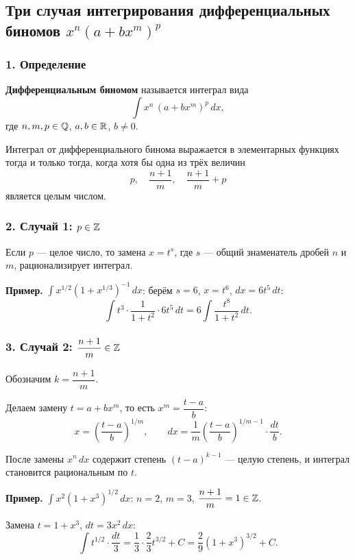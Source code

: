 \subsection{Три случая интегрирования дифференциальных биномов $x^n(a+bx^m)^p$}

\subsubsection*{1. Определение}

\textbf{Дифференциальным биномом} называется интеграл вида
\[
\int x^n\,(a + bx^m)^p\,dx,
\]
где $n, m, p \in \mathbb{Q}$, $a, b \in \mathbb{R}$, $b \neq 0$.

\begin{theorem}
Интеграл от дифференциального бинома выражается в элементарных функциях тогда и только тогда, когда хотя бы одна из трёх величин
\[ p, \quad \frac{n+1}{m}, \quad \frac{n+1}{m}+p \]
является целым числом.
\end{theorem}

\subsubsection*{2. Случай 1: $p \in \mathbb{Z}$}

Если $p$ — целое число, то замена $x = t^s$, где $s$ — общий знаменатель дробей $n$ и $m$, рационализирует интеграл.

\textbf{Пример.} $\displaystyle\int x^{1/2}(1+x^{1/3})^{-1}\,dx$: берём $s = 6$, $x = t^6$, $dx = 6t^5\,dt$:
\[
\int t^3\cdot\frac{1}{1+t^2}\cdot 6t^5\,dt = 6\int\frac{t^8}{1+t^2}\,dt.
\]

\subsubsection*{3. Случай 2: $\dfrac{n+1}{m} \in \mathbb{Z}$}

Обозначим $k = \dfrac{n+1}{m}$.

Делаем замену $t = a + bx^m$, то есть $x^m = \dfrac{t-a}{b}$:
\[
x = \left(\frac{t-a}{b}\right)^{1/m}, \qquad
dx = \frac{1}{m}\left(\frac{t-a}{b}\right)^{1/m - 1}\cdot\frac{dt}{b}.
\]

После замены $x^n\,dx$ содержит степень $(t-a)^{k-1}$ — целую степень, и интеграл становится рациональным по $t$.

\textbf{Пример.} $\displaystyle\int x^2(1+x^3)^{1/2}\,dx$: $n=2$, $m=3$, $\dfrac{n+1}{m} = 1 \in \mathbb{Z}$.

Замена $t = 1+x^3$, $dt = 3x^2\,dx$:
\[
\int t^{1/2}\cdot\frac{dt}{3} = \frac{1}{3}\cdot\frac{2}{3}t^{3/2}+C = \frac{2}{9}(1+x^3)^{3/2}+C.
\]

